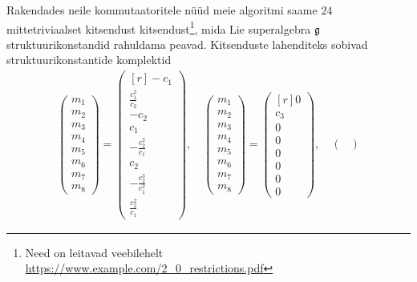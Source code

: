 Rakendades neile kommutaatoritele nüüd meie algoritmi saame $24$
mittetriviaalset kitsendust kitsendust\footnote{Need on leitavad veebilehelt
\url{https://www.example.com/2_0_restrictions.pdf}},
mida Lie superalgebra $\mathfrak{g}$ struktuurikonstandid rahuldama peavad. Kitsenduste
lahenditeks sobivad struktuurikonstantide komplektid
\renewcommand\arraystretch{1}
\begin{align*}
    \begin{pmatrix}
        m_1 \\
        m_2 \\
        m_3 \\
        m_4 \\
        m_5 \\
        m_6 \\
        m_7 \\
        m_8
    \end{pmatrix}
    =
    \begin{pmatrix*}[r]
        -c_1 \\
        \frac{c_1^2}{c_2} \\
        -c_2 \\
        c_1 \\
        -\frac{c_2^2}{c_1} \\
        c_2 \\
        -\frac{c_2^3}{c_1^2} \\
        \frac{c_2^2}{c_1}
    \end{pmatrix*},
    \quad
    \begin{pmatrix}
        m_1 \\
        m_2 \\
        m_3 \\
        m_4 \\
        m_5 \\
        m_6 \\
        m_7 \\
        m_8
    \end{pmatrix}
    =
    \begin{pmatrix*}[r]
        0 \\
        c_3 \\
        0 \\
        0 \\
        0 \\
        0 \\
        0 \\
        0
    \end{pmatrix*},
    \quad
    \begin{pmatrix}

\end{pmatrix}
\end{align*}
